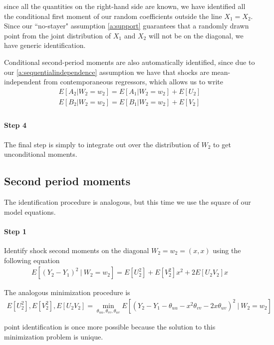 \noindent since all the quantities on the right-hand side are known, we have identified all the conditional first moment of our random coefficients outside the line $X_1 = X_2$. Since our ``no-stayer" assumption \ref{a:support} guarantees that a randomly drawn point from the joint distribution of $X_1$ and $X_2$ will not be on the diagonal, we have generic identification.

Conditional second-period moments are also automatically identified, since due to our \ref{a:sequentialindependence} assumption we have that shocks are mean-independent from contemporaneous regressors, which allows us to write
\begin{align}
  E[A_2 | W_2 = w_2] = E[A_1|W_2 = w_2] + E[U_2] \\
  E[B_2 | W_2 = w_2] = E[B_1|W_2 = w_2] + E[V_2] \\
\end{align}

\paragraph{Step 4} The final step is simply to integrate out over the distribution of $W_2$ to get unconditional moments. 

\subsection{Second period moments} The identification procedure is analogous, but this time we use the square of our model equations.

\paragraph{Step 1} Identify shock second moments on the diagonal $W_2 = w_2 = (x, x)$ using the following equation
\begin{align}
  E[(Y_{2} - Y_{1})^2 \ | \  W_{2} = w_{2}] = 
  E[U_{2}^2] + E[V_{2}^2]x^2 + 2E[U_{2}V_{2}]x
\end{align}

\noindent The analogous minimization procedure is
\begin{align}
E[U_2^2], E[V_2^2], E[U_2V_2] =
  \min_{\theta_{uu}, \theta_{vv}, \theta_{uv}}  
  E[(Y_{2} - Y_{1} - \theta_{uu} -  x^2\theta_{vv} - 2x\theta_{uv})^2 \  | \ W_2 = w_2]
\end{align}

\noindent point identification is once more possible because the solution to this minimization problem is unique.

